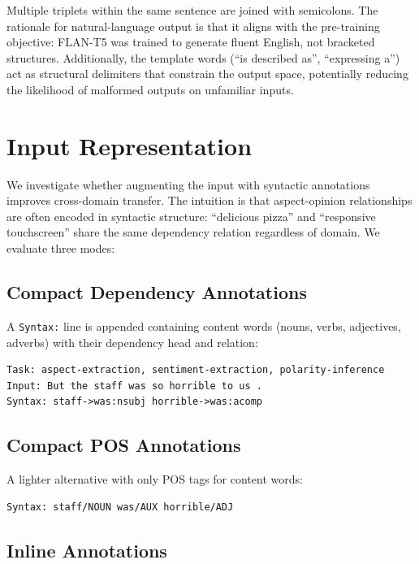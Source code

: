 \documentclass[12pt,a4paper]{report}
\begin{document}
Multiple triplets within the same sentence are joined with semicolons. The rationale for natural-language output is that it aligns with the pre-training objective: FLAN-T5 was trained to generate fluent English, not bracketed structures. Additionally, the template words (``is described as'', ``expressing a'') act as structural delimiters that constrain the output space, potentially reducing the likelihood of malformed outputs on unfamiliar inputs.


\section{Input Representation}\label{sec:syntax}

We investigate whether augmenting the input with syntactic annotations improves cross-domain transfer. The intuition is that aspect-opinion relationships are often encoded in syntactic structure: ``delicious pizza'' and ``responsive touchscreen'' share the same dependency relation regardless of domain. We evaluate three modes:

\subsection{Compact Dependency Annotations}

A \texttt{Syntax:} line is appended containing content words (nouns, verbs, adjectives, adverbs) with their dependency head and relation:

\begin{lstlisting}
Task: aspect-extraction, sentiment-extraction, polarity-inference
Input: But the staff was so horrible to us .
Syntax: staff->was:nsubj horrible->was:acomp
\end{lstlisting}

\subsection{Compact POS Annotations}

A lighter alternative with only POS tags for content words:

\begin{lstlisting}
Syntax: staff/NOUN was/AUX horrible/ADJ
\end{lstlisting}

\subsection{Inline Annotations}
\end{document}
